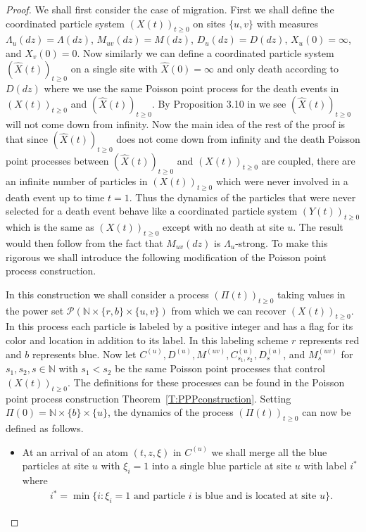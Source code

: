 \documentclass[11pt]{article}
\theoremstyle{definition}
\newcommand{\N}{\mathbb{N}}
\newcommand{\thmref}[1]{Theorem~\ref{T:#1}}
\begin{document}
\begin{proof}
    We shall first consider the case of migration. First we shall define the coordinated particle system $(X(t))_{t \geq 0}$ on sites $\{u,v\}$ with measures $\Lambda_u(dz) = \Lambda(dz)$, $M_{uv}(dz) = M(dz)$, $D_u(dz) = D(dz)$, $X_u(0) = \infty$, and $X_v(0) = 0$. Now similarly we can define a coordinated particle system $(\widehat{X}(t))_{t\geq 0}$ on a single site with $\widehat{X}(0) = \infty$ and only death according to $D(dz)$ where we use the same Poisson point process for the death events in $(X(t))_{t \geq 0}$ and $(\widehat{X}(t))_{t\geq 0}$. By Proposition 3.10 in \cite{CPS2021} we see $(\widehat{X}(t))_{t\geq 0}$ will not come down from infinity. Now the main idea of the rest of the proof is that since $(\widehat{X}(t))_{t\geq 0}$ does not come down from infinity and the death Poisson point processes between $(\widehat{X}(t))_{t\geq 0}$ and $(X(t))_{t\geq 0}$ are coupled, there are an infinite number of particles in $(X(t))_{t\geq 0}$ which were never involved in a death event up to time $t = 1$. Thus the dynamics of the particles that were never selected for a death event behave like a coordinated particle system $(Y(t))_{t \geq 0}$ which is the same as $(X(t))_{t \geq 0}$ except with no death at site $u$. The result would then follow from the fact that $M_{uv}(dz)$ is $\Lambda_u$-strong. To make this rigorous we shall introduce the following modification of the Poisson point process construction.
    \medskip

    \noindent In this construction we shall consider a process $(\Pi(t))_{t \geq 0}$ taking values in the power set $\mathcal{P}(\N \times \{r,b\} \times\{u,v\})$ from which we can recover $(X(t))_{t \geq 0}$. In this process each particle is labeled by a positive integer and has a flag for its color and location in addition to its label. In this labeling scheme $r$ represents red and $b$ represents blue. Now let $C^{(u)}, D^{(u)}, M^{(uv)}, C_{s_1,s_2}^{(u)}, D_s^{(u)}$, and $ M_s^{(uv)}$ for $s_1, s_2, s \in \N$ with $s_1 < s_2$ be the same Poisson point processes that control $(X(t))_{t \geq 0}$. The definitions for these processes can be found in the Poisson point process construction \thmref{PPPconstruction}. Setting $\Pi(0) = \N \times \{b\} \times \{u\}$, the dynamics of the process $(\Pi(t))_{t \geq 0}$ can now be defined as follows.

    \begin{itemize}
        \item At an arrival of an atom $(t,z, \xi)$ in $C^{(u)}$ we shall merge all the blue particles at site $u$ with $\xi_i = 1$ into a single blue particle at site $u$ with label $i^*$ where
        \begin{align*}
            i^* = \min \{i \colon \xi_i = 1 \text{ and particle $i$ is blue and is located at site $u$}\}.
        \end{align*}


\end{itemize}
\end{proof}
\end{document}
